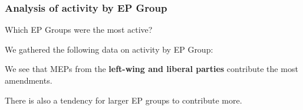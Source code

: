 \documentclass{beamer}
\begin{document}
\begin{frame}
	\frametitle{Analysis of activity by EP Group}
	Which EP Groups were the most active?
	
	\pause We gathered the following data on activity by EP Group:
	
	\vspace{0.3cm}
	
	
	\vspace{0.3cm}
	
	\pause We see that MEPs from the \textbf{left-wing and liberal parties} contribute the most amendments.
	
	\pause There is also a tendency for larger EP groups to contribute more.
	
\end{frame}
\end{document}
